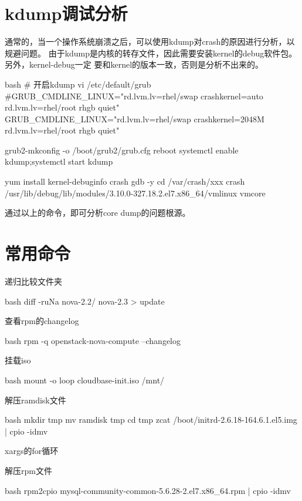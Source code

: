 \section{kdump调试分析}
通常的，当一个操作系统崩溃之后，可以使用kdump对crash的原因进行分析，以规避问题。
由于kdump是内核的转存文件，因此需要安装kernel的debug软件包。另外，kernel-debug一定
要和kernel的版本一致，否则是分析不出来的。
\begin{code-block}{bash}
# 开启kdump
vi /etc/default/grub
#GRUB_CMDLINE_LINUX="rd.lvm.lv=rhel/swap crashkernel=auto rd.lvm.lv=rhel/root rhgb quiet"
GRUB_CMDLINE_LINUX="rd.lvm.lv=rhel/swap crashkernel=2048M rd.lvm.lv=rhel/root rhgb quiet"

grub2-mkconfig -o /boot/grub2/grub.cfg
reboot
systemctl enable kdump;systemctl start kdump

yum install kernel-debuginfo crash gdb -y
cd /var/crash/xxx
crash /usr/lib/debug/lib/modules/3.10.0-327.18.2.el7.x86_64/vmlinux vmcore
\end{code-block}

通过以上的命令，即可分析core dump的问题根源。

\section{常用命令}
\begin{outline}[enumerate]
\1 递归比较文件夹
\begin{code-in-enumerate}{bash}
diff -ruNa nova-2.2/ nova-2.3 > update
\end{code-in-enumerate}

\1 查看rpm的changelog
\begin{code-in-enumerate}{bash}
rpm -q openstack-nova-compute --changelog
\end{code-in-enumerate}

\1 挂载iso
\begin{code-in-enumerate}{bash}
mount -o loop cloudbase-init.iso /mnt/
\end{code-in-enumerate}

\1 解压ramdisk文件
\begin{code-in-enumerate}{bash}
mkdir tmp
mv ramdisk tmp
cd tmp
zcat /boot/initrd-2.6.18-164.6.1.el5.img | cpio -idmv
\end{code-in-enumerate}

\1 xargs的for循环

\1 解压rpm文件
\begin{code-in-enumerate}{bash}
rpm2cpio mysql-community-common-5.6.28-2.el7.x86_64.rpm | cpio -idmv
\end{code-in-enumerate}

\end{outline}
